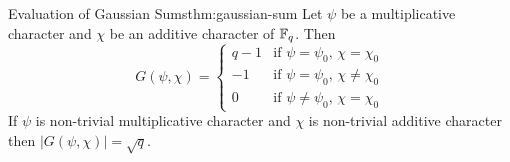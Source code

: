 \begin{Theorem}{Evaluation of Gaussian Sums}{thm:gaussian-sum}
  Let $\psi$ be a multiplicative character and $\chi$ be an additive character of $\mathbb{F}_q$. Then \begin{equation}
    G(\psi,\chi)=\begin{cases}
      q-1 & \text{if $\psi=\psi_0$, $\chi=\chi_0$}     \\
      -1  & \text{if $\psi=\psi_0$, $\chi\neq \chi_0$} \\
      0   & \text{if $\psi\neq \psi_0$, $\chi=\chi_0$}
    \end{cases}
  \end{equation}
  If $\psi$ is non-trivial multiplicative character and $\chi$ is non-trivial additive character then $|G(\psi,\chi)|=\sqrt{q}$.
\end{Theorem}
